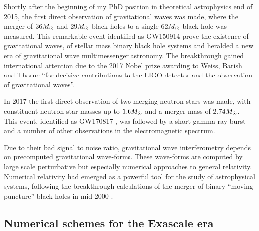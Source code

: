 \vspace{.5cm}
\begin{fullwidth}
%
Shortly after the beginning of my PhD position in theoretical
astrophysics end of 2015, the first
direct observation of gravitational waves was made, where the merger of
$36M_{\odot}$ and $29M_{\odot}$ black holes to a single $62M_{\odot}$ black hole was
measured. This remarkable event identified as GW150914 \cite{Abbott2016aa}
prove the existence of
gravitational waves, of stellar mass binary black hole systems and heralded a
new era of gravitational wave multimessenger astronomy. The breakthrough gained
international attention due to the 2017 Nobel prize awarding to Weiss,
Barish and Thorne ``for decisive contributions to the LIGO
detector and the observation of gravitational waves''.

In 2017 the first direct observation of two merging neutron
stars was made, with constituent neutron star masses up to $1.6M_{\odot}$ and
a merger mass of $2.74M_{\odot}$. This event, identified as GW170817 
\cite{Abbott2017}, was followed by a short gamma-ray burst and a number of
other observations in the electromagnetic spectrum.

Due to their bad signal to noise ratio, gravitational wave interferometry
depends on precomputed gravitational wave-forms. These wave-forms are computed
by large scale perturbative but especially numerical approaches to general
relativity. Numerical relativity had emerged as a powerful tool
for the study of astrophysical systems, following the breakthrough
calculations of the merger of binary ``moving puncture''
black holes in mid-2000
\cite{Pretorius:2005gq,Campanelli06,
	Baker05a,Baker-etal:2007a,Bruegmann:2006at,Hannam:2008sg}.

\subsection{Numerical schemes for the Exascale era}


\end{fullwidth}
